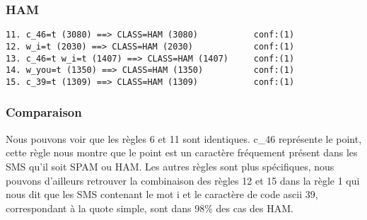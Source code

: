 \subsubsection{HAM}

\begin{verbatim}
11. c_46=t (3080) ==> CLASS=HAM (3080)           conf:(1)
12. w_i=t (2030) ==> CLASS=HAM (2030)            conf:(1)
13. c_46=t w_i=t (1407) ==> CLASS=HAM (1407)     conf:(1)
14. w_you=t (1350) ==> CLASS=HAM (1350)          conf:(1)
15. c_39=t (1309) ==> CLASS=HAM (1309)           conf:(1)
\end{verbatim}

\subsubsection{Comparaison}

Nous pouvons voir que les règles 6 et 11 sont identiques. \og c\_46 \fg{} représente le point, cette règle nous montre que le point est un caractère fréquement présent dans les SMS qu'il soit SPAM ou HAM. Les autres règles sont plus spécifiques, nous pouvons d'ailleurs retrouver la combinaison des règles 12 et 15 dans la règle 1 qui nous dit que les SMS contenant le mot \og i \fg{} et le caractère de code ascii 39, correspondant à la quote simple, sont dans 98\% des cas des HAM.
